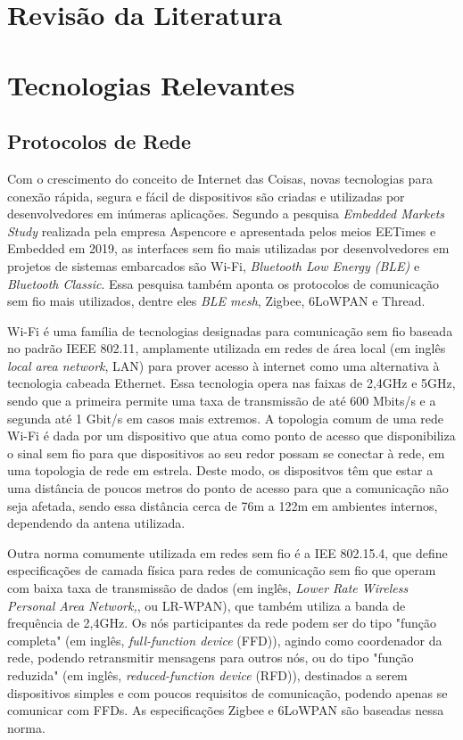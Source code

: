 \documentclass[../monografia.tex]{subfiles}
\begin{document}
\section{Revisão da Literatura} 

\section{Tecnologias Relevantes} 
\subsection{Protocolos de Rede} 

Com o crescimento do conceito de Internet das Coisas, novas tecnologias para conexão rápida, segura e fácil de dispositivos são criadas e utilizadas por desenvolvedores em inúmeras aplicações. Segundo a pesquisa \textit{Embedded Markets Study} realizada pela empresa Aspencore\cite{embedded-market-study} e apresentada pelos meios EETimes\cite{eetimes} e Embedded\cite{embedded} em 2019, as interfaces sem fio mais utilizadas por desenvolvedores em  projetos de sistemas embarcados são Wi-Fi, \textit{Bluetooth Low Energy (BLE)} e \textit{Bluetooth Classic}. Essa pesquisa também aponta os protocolos de comunicação sem fio mais utilizados, dentre eles \textit{BLE mesh}, Zigbee, 6LoWPAN e Thread. 

Wi-Fi é uma família de tecnologias designadas para comunicação sem fio baseada no padrão IEEE 802.11\cite{802.11}, amplamente utilizada em redes de área local (em inglês \textit{local area network}, LAN) para prover acesso à internet como uma alternativa à tecnologia cabeada Ethernet. Essa tecnologia opera nas faixas de 2,4GHz e 5GHz, sendo que a primeira permite uma taxa de transmissão de até 600 Mbits/s e a segunda até 1 Gbit/s em casos mais extremos\cite{Wi-Fi-datarate}. A topologia comum de uma rede Wi-Fi é dada por um  dispositivo que atua como ponto de acesso que disponibiliza o sinal sem fio para que dispositivos ao seu redor possam se conectar à rede, em uma topologia de rede em estrela. Deste modo, os dispositvos têm que estar a uma distância de poucos metros do ponto de acesso para que a comunicação não seja afetada, sendo essa distância cerca de 76m a 122m em ambientes internos\cite{wifi-range}, dependendo da antena utilizada.

Outra norma comumente utilizada em redes sem fio é a IEE 802.15.4, que define especificações de camada física para redes de comunicação sem fio que operam com baixa taxa de transmissão de dados (em inglês, \textit{Lower Rate Wireless Personal Area Network,}, ou LR-WPAN), que também utiliza a banda de frequência de 2,4GHz\cite{802.15.4}. Os nós participantes da rede podem ser do tipo "função completa" (em inglês, \textit{full-function device} (FFD)), agindo como coordenador da rede, podendo retransmitir mensagens para outros nós, ou do tipo "função reduzida" (em inglês, \textit{reduced-function device} (RFD)), destinados a serem dispositivos simples e com poucos requisitos de comunicação, podendo apenas se comunicar com FFDs. As especificações Zigbee e 6LoWPAN são baseadas nessa norma.
\end{document}
